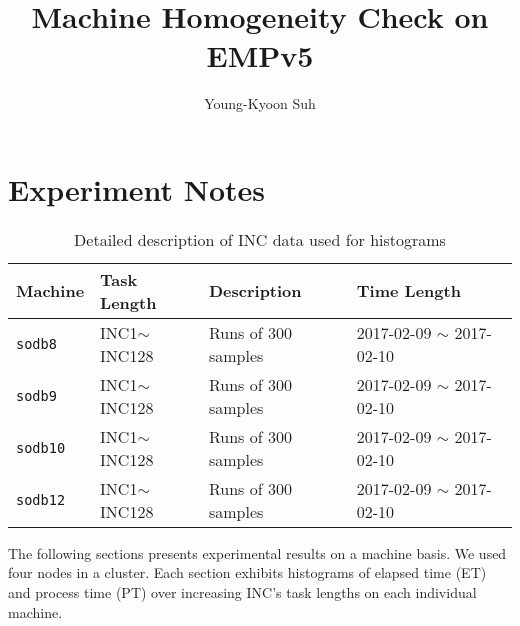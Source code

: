 \documentclass[10pt]{article}
\begin{document}
\title{Machine Homogeneity Check on EMPv5}

\author{
Young-Kyoon Suh\\
}
\maketitle

\section{Experiment Notes}
\begin{table}[h]
\begin{center}
\begin{tabular}{|p{2cm}|p{3cm}|p{6cm}|p{4cm}|} \hline
Machine & Task Length & Description & Time Length\\ \hline
{\tt sodb8} &  INC1$\sim$INC128 & Runs of 300 samples & 2017-02-09 $\sim$ 2017-02-10\\ \hline
{\tt sodb9} &  INC1$\sim$INC128 & Runs of 300 samples & 2017-02-09 $\sim$ 2017-02-10\\ \hline
{\tt sodb10} & INC1$\sim$INC128 & Runs of 300 samples & 2017-02-09 $\sim$ 2017-02-10\\ \hline
{\tt sodb12} & INC1$\sim$INC128 & Runs of 300 samples & 2017-02-09 $\sim$ 2017-02-10\\ \hline
\end{tabular}
\end{center}
\vspace{-.2in}
\caption{Detailed description of INC data used for histograms\label{tab:exp_notes}}
\end{table}

The following sections presents experimental results on a machine basis. 
We used four nodes in a cluster. 
Each section exhibits histograms of elapsed time (ET) and process time (PT) 
over increasing INC's task lengths on each individual machine. 






\end{document}
